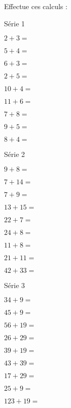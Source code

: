 \begin{myenumerate}
\item Effectue ces calculs :
\begin{multicols}{3}
\begin{center}
Série 1
\end{center}
\begin{Myenumerate}
\item$2+3=$\dotfill
\item$5+4=$\dotfill
\item$6+3=$\dotfill
\item$2+5=$\dotfill
\item$10+4=$\dotfill
\item$11+6=$\dotfill
\item$7+8=$\dotfill
\item$9+5=$\dotfill
\item$8+4=$\dotfill
\end{Myenumerate}
\par
\begin{center}
Série 2
\end{center}
\begin{Myenumerate}
\item$9+8=$\dotfill
\item$7+14=$\dotfill
\item$7+9=$\dotfill
\item$13+15=$\dotfill
\item$22+7=$\dotfill
\item$24+8=$\dotfill
\item$11+8=$\dotfill
\item$21+11=$\dotfill
\item$42+33=$\dotfill
\end{Myenumerate}
\par
\begin{center}
Série 3
\end{center}
\begin{Myenumerate}
\item$34+9=$\dotfill
\item$45+9=$\dotfill
\item$56+19=$\dotfill
\item$26+29=$\dotfill
\item$39+19=$\dotfill
\item$43+39=$\dotfill
\item$17+29=$\dotfill
\item$25+9=$\dotfill
\item$123+19=$\dotfill
\end{Myenumerate}

\end{multicols}
\end{myenumerate}

